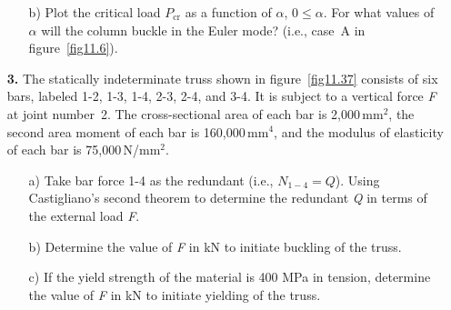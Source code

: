 \documentclass{AeroStructure-ERJohnson}
\begin{document}
\begin{exercise}
\begin{enumerate}[\textbf{2.}]
\begin{enumerate}[b)]
\item[{\hskip13pt}b)] Plot the critical load $P_{\mathrm{cr}}$ as a function of $\alpha$, $0 \leq \alpha$. For what values of $\alpha$ will the column buckle in the Euler mode? (i.e., case~A in figure~\ref{fig11.6}).

\vspace*{-10pt}

\end{enumerate}
\vspace*{-12pt}


\item[\textbf{3.}] The statically indeterminate truss shown in figure~\ref{fig11.37} consists of six bars, labeled 1-2, 1-3, 1-4, 2-3, 2-4, and 3-4. It is subject to a vertical force \textit{F} at joint number~2. The cross-sectional area of each bar is 2{,}000\,mm$^{2}$, the second area moment of each bar is 160{,}000\,mm$^{4}$, and the modulus of elasticity of each bar is 75{,}000\,N/mm$^{2}$.



\begin{enumerate}[b)]
\item[{\hskip13pt}a)] Take bar force 1-4 as the redundant (i.e., $N_{1-4}=Q$). Using Castigliano's second theorem to determine the redundant \textit{Q} in terms of the external load \textit{F}.

\item[{\hskip13pt}b)] Determine the value of \textit{F} in kN to initiate buckling of the truss.

\item[{\hskip13pt}c)] If the yield strength of the material is 400 MPa in tension, determine the value of \textit{F} in kN to initiate yielding of the truss\vadjust{\vspace*{8pt}\pagebreak}.
\end{enumerate}


\end{enumerate}
\end{exercise}
\end{document}
